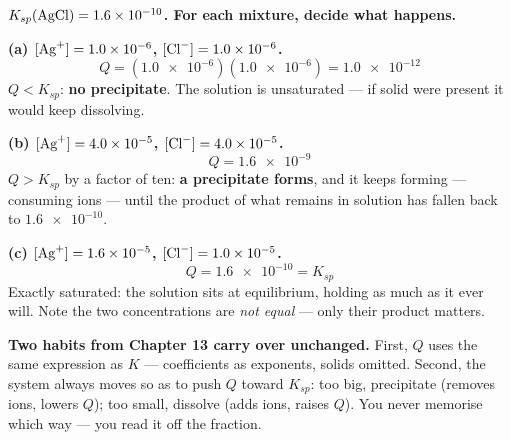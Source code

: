 \documentclass{apchem-worksheet}
\begin{document}
\begin{center}
\end{center}

\begin{workedexample}
\textbf{$K_{sp}(\ce{AgCl}) = \num{1.6e-10}$. For each mixture, decide
what happens.}

\textbf{(a) $[\ce{Ag+}] = \num{1.0e-6}$, $[\ce{Cl-}] =
\num{1.0e-6}$.}
\[ Q = (\num{1.0e-6})(\num{1.0e-6}) = \num{1.0e-12} \]
$Q < K_{sp}$: \textbf{no precipitate}. The solution is unsaturated ---
if solid  were present it would keep dissolving.

\textbf{(b) $[\ce{Ag+}] = \num{4.0e-5}$, $[\ce{Cl-}] =
\num{4.0e-5}$.}
\[ Q = \num{1.6e-9} \]
$Q > K_{sp}$ by a factor of ten: \textbf{a precipitate forms}, and it
keeps forming --- consuming ions --- until the product of what remains
in solution has fallen back to $\num{1.6e-10}$.

\textbf{(c) $[\ce{Ag+}] = \num{1.6e-5}$, $[\ce{Cl-}] =
\num{1.0e-5}$.}
\[ Q = \num{1.6e-10} = K_{sp} \]
Exactly saturated: the solution sits at equilibrium, holding as much as
it ever will. Note the two concentrations are \emph{not equal} --- only
their product matters.

\textbf{Two habits from Chapter 13 carry over unchanged.} First, $Q$
uses the same expression as $K$ --- coefficients as exponents, solids
omitted. Second, the system always moves so as to push $Q$ toward
$K_{sp}$: too big, precipitate (removes ions, lowers $Q$); too small,
dissolve (adds ions, raises $Q$). You never memorise which way ---
you read it off the fraction.
\end{workedexample}
\end{document}
